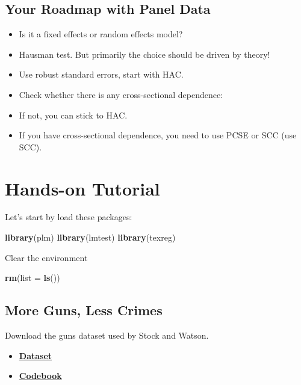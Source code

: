 \documentclass[]{article}
\newenvironment{Shaded}{\begin{snugshade}}{\end{snugshade}}
\newcommand{\KeywordTok}[1]{\textcolor[rgb]{0.13,0.29,0.53}{\textbf{{#1}}}}
\newcommand{\DataTypeTok}[1]{\textcolor[rgb]{0.13,0.29,0.53}{{#1}}}
\newcommand{\NormalTok}[1]{{#1}}
\providecommand{\tightlist}{%
  \setlength{\itemsep}{0pt}\setlength{\parskip}{0pt}}
\theoremstyle{definition}
\theoremstyle{definition}
\theoremstyle{remark}
\begin{document}
\subsection{Your Roadmap with Panel
Data}\label{your-roadmap-with-panel-data}

\begin{itemize}
\item
  Is it a fixed effects or random effects model?
\item
  Hausman test. But primarily the choice should be driven by theory!
\item
  Use robust standard errors, start with HAC.
\item
  Check whether there is any cross-sectional dependence:
\item
  If not, you can stick to HAC.
\item
  If you have cross-sectional dependence, you need to use PCSE or SCC
  (use SCC).
\end{itemize}

\section{Hands-on Tutorial}\label{hands-on-tutorial}

Let's start by load these packages:

\begin{Shaded}
\begin{Highlighting}[]
\KeywordTok{library}\NormalTok{(plm)}
\KeywordTok{library}\NormalTok{(lmtest)}
\KeywordTok{library}\NormalTok{(texreg)}
\end{Highlighting}
\end{Shaded}

Clear the environment

\begin{Shaded}
\begin{Highlighting}[]
\KeywordTok{rm}\NormalTok{(}\DataTypeTok{list =} \KeywordTok{ls}\NormalTok{())}
\end{Highlighting}
\end{Shaded}

\subsection{More Guns, Less Crimes}\label{more-guns-less-crimes}

Download the guns dataset used by Stock and Watson.

\begin{itemize}
\tightlist
\item
  \textbf{\href{http://uclspp.github.io/PUBLG100/data/guns.csv}{Dataset}}
\item
  \textbf{\href{http://wps.aw.com/wps/media/objects/11422/11696965/data3eu/Guns_Description.pdf}{Codebook}}
\end{itemize}
\end{document}
